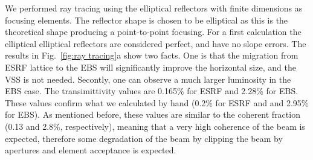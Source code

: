 \documentclass{iucr}              %
\newcommand{\inred}[1]{{\color{red}#1}}
\begin{document}


We performed ray tracing using the elliptical reflectors with finite dimensions as focusing elements. The reflector shape is chosen to be elliptical as this is the theoretical shape producing a point-to-point focusing. For a first calculation  the elliptical elliptical reflectors are considered perfect, and have no slope errors. 
The results in Fig.~\ref{fig:ray tracing}a show two facts. One is that the migration from ESRF lattice to the EBS will significantly improve the horizontal size, and the VSS is not needed. Secontly, one can observe a much larger luminosity in the EBS case. The transimittivity values are 0.165\% for ESRF and 2.28\% for EBS. These values confirm what we calculated by hand (0.2\% for ESRF and and 2.95\% for EBS). As mentioned before, these values are similar to the coherent fraction \cite{coherentfraction} (0.13 and 2.8\%, respectively), meaning that a very high coherence of the beam is expected, therefore some degradation of the beam by clipping the beam by apertures and element acceptance is expected. 
\end{document}
